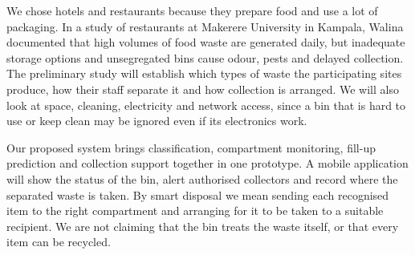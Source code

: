 We chose hotels and restaurants because they prepare food and use a lot of packaging. In a study of restaurants at Makerere University in Kampala, Walina \cite{walina} documented that high volumes of food waste are generated daily, but inadequate storage options and unsegregated bins cause odour, pests and delayed collection. The preliminary study will establish which types of waste the participating sites produce, how their staff separate it and how collection is arranged. We will also look at space, cleaning, electricity and network access, since a bin that is hard to use or keep clean may be ignored even if its electronics work.

Our proposed system brings classification, compartment monitoring, fill-up prediction and collection support together in one prototype. A mobile application will show the status of the bin, alert authorised collectors and record where the separated waste is taken. By smart disposal we mean sending each recognised item to the right compartment and arranging for it to be taken to a suitable recipient. We are not claiming that the bin treats the waste itself, or that every item can be recycled.
